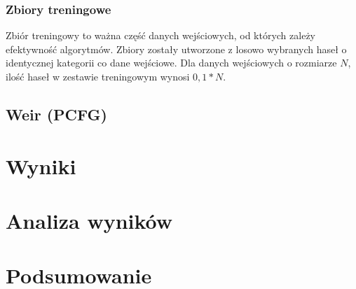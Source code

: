 \documentclass{article}
\begin{document}
	\subsubsection{Zbiory treningowe}
	Zbiór treningowy to ważna część danych wejściowych, od których zależy efektywność algorytmów. Zbiory zostały utworzone z losowo wybranych haseł o identycznej kategorii co dane wejściowe. Dla danych wejściowych o rozmiarze $N$, ilość haseł w zestawie treningowym wynosi $ 0,1 * N $.
	
	
	\subsection{Weir (PCFG)}
	
	\section{Wyniki}
	
	\section{Analiza wyników}
	
	\section{Podsumowanie}
	
	\newpage
	
	
\end{document}
